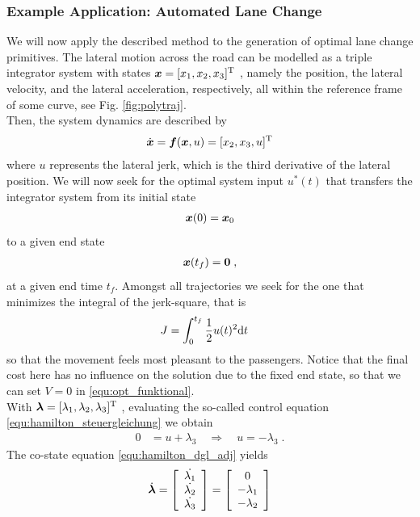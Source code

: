 \subsubsection{Example Application: Automated Lane Change}\label{S:57.3.1.2}
We will now apply the described method to the generation of optimal lane change primitives. The lateral motion across the road can be modelled as a triple integrator system with states $\bs x = [x_1, x_2, x_3]^\T$ , namely the position, the lateral velocity, and the lateral acceleration, respectively, all within the reference frame of some curve, see Fig. \ref{fig:polytraj}. \\
Then, the system dynamics are described by 
\begin{align}
	\dot{\bs x} = \bs f(\bs x, u) = [x_2, x_3, u ]^\T
	\label{equ:stateeqlc}
\end{align}
where $u$ represents the lateral jerk, which is the third derivative of the lateral position. We will now seek for the optimal system input $u^\ast (t)$  that transfers the integrator system from its initial state
\begin{align}
	\bs x(0) = \bs x_0 \label{equ:x_0}
\end{align}
to a given end state 
\begin{align}
\bs x(t_f) = \bs 0 \;, \label{equ:x_f}
\end{align}
at a given end time $t_f$. Amongst all trajectories we seek for the one that minimizes the integral of the jerk-square, that is
\begin{align}
	J &= %
	\int_{0}^{t_f}\frac{1}{2} u(t)^2 {\rm d} t \label{equ:integrator_J}
\end{align}
so that the movement feels most pleasant to the passengers. Notice that the final cost here has no influence on the solution due to the fixed end state, so that we can set $V=0$ in \eqref{equ:opt_funktional}. \\
With $\bs \lambda =[\lambda_1, \lambda_2, \lambda_3]^\T$ , evaluating the so-called control equation \eqref{equ:hamilton_steuergleichung} we obtain
\begin{align}
	0 &=  u + \lambda_3 \quad \Rightarrow \quad u = -\lambda_3 \;. \label{equ:integrator_u}
\end{align}
The co-state equation \eqref{equ:hamilton_dgl_adj} yields
\begin{align*}
	\dot {\bs \lambda} = 
	\mtrx{c}{\dot{\lambda_1} \\ \dot{\lambda_2} \\ \dot{\lambda_3}}=
	\mtrx{c}{0 \\ -\lambda_1 \\ -\lambda_2}
\end{align*}
